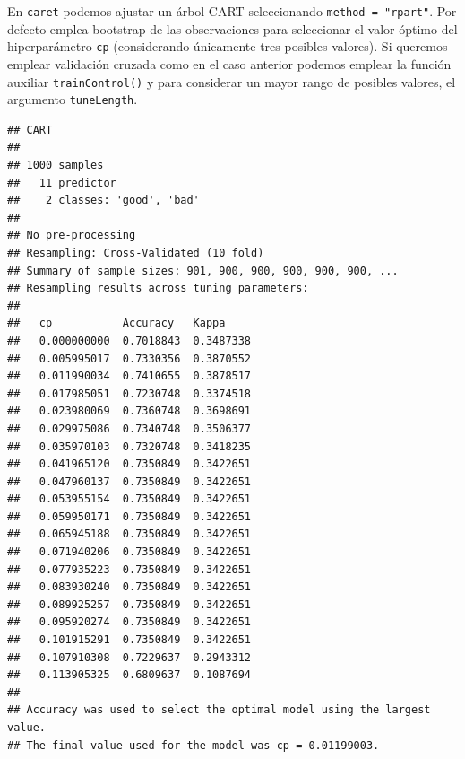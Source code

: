 \documentclass[
]{book}
\newenvironment{Shaded}{\begin{snugshade}}{\end{snugshade}}
\newcommand{\CommentTok}[1]{\textcolor[rgb]{0.56,0.35,0.01}{\textit{#1}}}
\newcommand{\DataTypeTok}[1]{\textcolor[rgb]{0.13,0.29,0.53}{#1}}
\newcommand{\DecValTok}[1]{\textcolor[rgb]{0.00,0.00,0.81}{#1}}
\newcommand{\KeywordTok}[1]{\textcolor[rgb]{0.13,0.29,0.53}{\textbf{#1}}}
\newcommand{\NormalTok}[1]{#1}
\newcommand{\OperatorTok}[1]{\textcolor[rgb]{0.81,0.36,0.00}{\textbf{#1}}}
\newcommand{\StringTok}[1]{\textcolor[rgb]{0.31,0.60,0.02}{#1}}
\theoremstyle{break}
\theoremstyle{definition}
\theoremstyle{definition}
\theoremstyle{definition}
\theoremstyle{remark}
\begin{document}
En \texttt{caret} podemos ajustar un árbol CART seleccionando \texttt{method\ =\ "rpart"}.
Por defecto emplea bootstrap de las observaciones para seleccionar el valor óptimo del hiperparámetro \texttt{cp} (considerando únicamente tres posibles valores).
Si queremos emplear validación cruzada como en el caso anterior podemos emplear la función auxiliar \texttt{trainControl()} y para considerar un mayor rango de posibles valores, el argumento \texttt{tuneLength}.

\begin{Shaded}
\end{Shaded}

\begin{verbatim}
## CART 
## 
## 1000 samples
##   11 predictor
##    2 classes: 'good', 'bad' 
## 
## No pre-processing
## Resampling: Cross-Validated (10 fold) 
## Summary of sample sizes: 901, 900, 900, 900, 900, 900, ... 
## Resampling results across tuning parameters:
## 
##   cp           Accuracy   Kappa    
##   0.000000000  0.7018843  0.3487338
##   0.005995017  0.7330356  0.3870552
##   0.011990034  0.7410655  0.3878517
##   0.017985051  0.7230748  0.3374518
##   0.023980069  0.7360748  0.3698691
##   0.029975086  0.7340748  0.3506377
##   0.035970103  0.7320748  0.3418235
##   0.041965120  0.7350849  0.3422651
##   0.047960137  0.7350849  0.3422651
##   0.053955154  0.7350849  0.3422651
##   0.059950171  0.7350849  0.3422651
##   0.065945188  0.7350849  0.3422651
##   0.071940206  0.7350849  0.3422651
##   0.077935223  0.7350849  0.3422651
##   0.083930240  0.7350849  0.3422651
##   0.089925257  0.7350849  0.3422651
##   0.095920274  0.7350849  0.3422651
##   0.101915291  0.7350849  0.3422651
##   0.107910308  0.7229637  0.2943312
##   0.113905325  0.6809637  0.1087694
## 
## Accuracy was used to select the optimal model using the largest value.
## The final value used for the model was cp = 0.01199003.
\end{verbatim}
\end{document}
